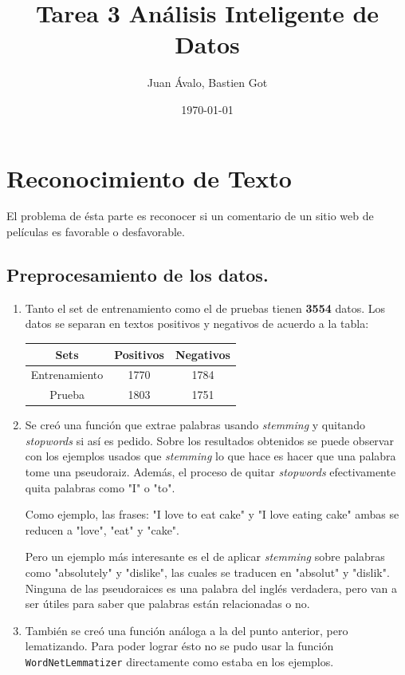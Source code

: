 \documentclass[11pt,letterpaper]{article}
\author{Juan Ávalo, Bastien Got}
\date{\today}
\title{Tarea 3 Análisis Inteligente de Datos}
\begin{document}
\maketitle
\tableofcontents


\section{Reconocimiento de Texto}
\label{sec:orgheadline3}
El problema de ésta parte es reconocer si un comentario de un sitio web de
películas es favorable o desfavorable.
\subsection{Preprocesamiento de los datos.}
\label{sec:orgheadline1}
\begin{enumerate}
\item Tanto el set de entrenamiento como el de pruebas tienen \textbf{3554} datos.
Los datos se separan en textos positivos y negativos de acuerdo a la tabla:
\begin{center}
\begin{tabular}{|c|c|c|}
\hline
Sets & Positivos & Negativos\\
\hline
Entrenamiento & 1770 & 1784\\
Prueba & 1803 & 1751\\
\hline
\end{tabular}
\end{center}
\item Se creó una función que extrae palabras usando \emph{stemming} y quitando
\emph{stopwords} si así es pedido. Sobre los resultados obtenidos se puede
observar con los ejemplos usados que \emph{stemming} lo que hace es hacer que
una palabra tome una pseudoraiz. Además, el proceso de quitar \emph{stopwords}
efectivamente quita palabras como "I" o "to".

Como ejemplo, las frases: "I love to eat cake" y "I love eating cake" ambas
se reducen a "love", "eat" y "cake".

Pero un ejemplo más interesante es el de aplicar \emph{stemming} sobre palabras
como "absolutely" y "dislike", las cuales se traducen en "absolut" y
"dislik". Ninguna de las pseudoraices es una palabra del inglés verdadera,
pero van a ser útiles para saber que palabras están relacionadas o no.
\item También se creó una función análoga a la del punto anterior, pero
lematizando. Para poder lograr ésto no se pudo usar la función
\texttt{WordNetLemmatizer} directamente como estaba en los ejemplos.


\end{enumerate}
\end{document}
